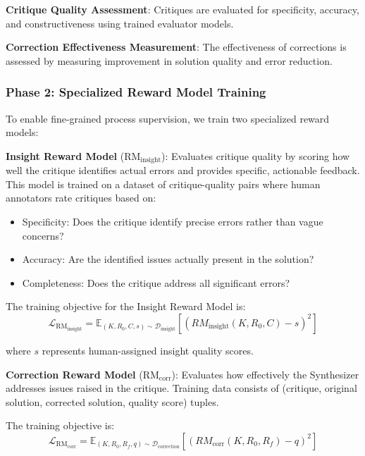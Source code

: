 \documentclass[10pt,twocolumn]{article}
\newcommand{\RMinsight}{\text{RM}_{\text{insight}}}
\newcommand{\RMcorr}{\text{RM}_{\text{corr}}}
\begin{document}
\textbf{Critique Quality Assessment}: Critiques are evaluated for specificity, accuracy, and constructiveness using trained evaluator models.

\textbf{Correction Effectiveness Measurement}: The effectiveness of corrections is assessed by measuring improvement in solution quality and error reduction.

\subsubsection{Phase 2: Specialized Reward Model Training}

To enable fine-grained process supervision, we train two specialized reward models:

\textbf{Insight Reward Model} ($\RMinsight$): Evaluates critique quality by scoring how well the critique identifies actual errors and provides specific, actionable feedback. This model is trained on a dataset of critique-quality pairs where human annotators rate critiques based on:
\begin{itemize}
\item Specificity: Does the critique identify precise errors rather than vague concerns?
\item Accuracy: Are the identified issues actually present in the solution?
\item Completeness: Does the critique address all significant errors?
\end{itemize}

The training objective for the Insight Reward Model is:
\begin{equation}
\mathcal{L}_{\RMinsight} = \mathbb{E}_{(K, R_0, C, s) \sim \mathcal{D}_{\text{insight}}} \left[ (RM_{\text{insight}}(K, R_0, C) - s)^2 \right]
\end{equation}

where $s$ represents human-assigned insight quality scores.

\textbf{Correction Reward Model} ($\RMcorr$): Evaluates how effectively the Synthesizer addresses issues raised in the critique. Training data consists of (critique, original solution, corrected solution, quality score) tuples.

The training objective is:
\begin{equation}
\mathcal{L}_{\RMcorr} = \mathbb{E}_{(K, R_0, R_f, q) \sim \mathcal{D}_{\text{correction}}} \left[ (RM_{\text{corr}}(K, R_0, R_f) - q)^2 \right]
\end{equation}
\end{document}
